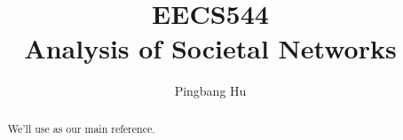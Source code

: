 \documentclass[a4paper]{article}
\author{Pingbang Hu}
\title{EECS544\\Analysis of Societal Networks}
\begin{document}
\maketitle

\begin{abstract}
	\par We'll use \cite{easley2010networks} as our main reference.
\end{abstract}

\tableofcontents

\newpage
\appendix
\appendixpage



\newpage
\printbibliography
\end{document}
